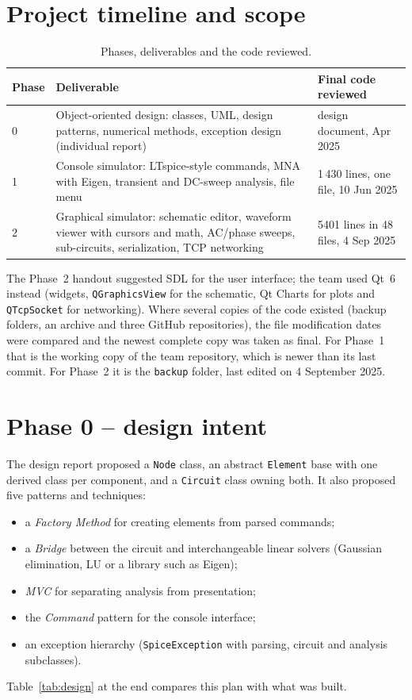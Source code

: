 \section{Project timeline and scope}
\begin{table}[h]
\centering\small
\caption{Phases, deliverables and the code reviewed.}\label{tab:phases}
\begin{tabularx}{\linewidth}{@{}l>{\raggedright\arraybackslash}Xl@{}}
\toprule
Phase & Deliverable & Final code reviewed \\
\midrule
0 & Object-oriented design: classes, UML, design patterns, numerical methods, exception design (individual report) & design document, Apr 2025 \\
1 & Console simulator: LTspice-style commands, MNA with Eigen, transient and DC-sweep analysis, file menu & 1\,430 lines, one file, 10 Jun 2025 \\
2 & Graphical simulator: schematic editor, waveform viewer with cursors and math, AC/phase sweeps, sub-circuits, serialization, TCP networking & \num{5401} lines in 48 files, 4 Sep 2025 \\
\bottomrule
\end{tabularx}
\end{table}
The Phase~2 handout suggested SDL for the user interface; the team used Qt~6 instead (widgets,
\texttt{QGraphicsView} for the schematic, Qt Charts for plots and \texttt{QTcpSocket} for networking).
Where several copies of the code existed (backup folders, an archive and three GitHub repositories),
the file modification dates were compared and the newest complete copy was taken as final. For Phase~1
that is the working copy of the team repository, which is newer than its last commit. For Phase~2 it
is the \texttt{backup} folder, last edited on 4 September 2025.

\section{Phase 0 -- design intent}
The design report proposed a \texttt{Node} class, an abstract \texttt{Element} base with one derived
class per component, and a \texttt{Circuit} class owning both. It also proposed five patterns and techniques:
\begin{itemize}
  \item a \emph{Factory Method} for creating elements from parsed commands;
  \item a \emph{Bridge} between the circuit and interchangeable linear solvers (Gaussian elimination, LU or a library such as Eigen);
  \item \emph{MVC} for separating analysis from presentation;
  \item the \emph{Command} pattern for the console interface;
  \item an exception hierarchy (\texttt{SpiceException} with parsing, circuit and analysis subclasses).
\end{itemize}
Table~\ref{tab:design} at the end compares this plan with what was built.

